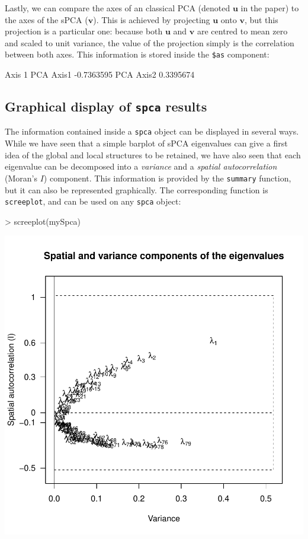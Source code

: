 \documentclass{article}
\newcommand{\m}[1]{\mathbf{#1}}
\begin{document}
\noindent Lastly, we can compare the axes of an classical
PCA (denoted $\m{u}$ in the paper) to the axes of the sPCA ($\m{v}$).
This is achieved by projecting $\m{u}$ onto $\m{v}$, but this
projection is a particular one: because both $\m{u}$ and $\m{v}$ are
centred to mean zero and scaled to unit variance, the value of the
projection simply is the correlation between both axes.
This information is stored inside the \texttt{\$as} component:
\begin{Schunk}
\begin{Soutput}
              Axis 1
PCA Axis1 -0.7363595
PCA Axis2  0.3395674
\end{Soutput}
\end{Schunk}





\subsection{Graphical display of \texttt{spca} results}

The information contained inside a \texttt{spca} object can be displayed
in several ways.
While we have seen that a simple barplot of sPCA eigenvalues can give a first idea of the
global and local structures to be retained, we have also seen that
each eigenvalue can be decomposed into a \textit{variance} and a
\textit{spatial autocorrelation} (Moran's $I$) component.
This information is provided by the \texttt{summary} function, but it
can also be represented graphically.
The corresponding function is \texttt{screeplot}, and can be used on any
\texttt{spca} object:
\begin{Schunk}
\begin{Sinput}
> screeplot(mySpca)
\end{Sinput}
\end{Schunk}
\includegraphics{spca-screeplot}
\end{document}
